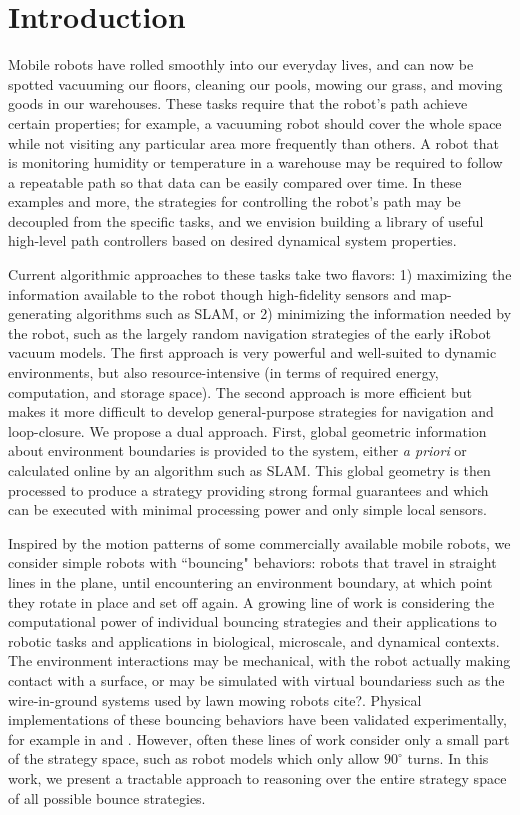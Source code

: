 \documentclass[]{styles/svproc}  %
\begin{document}
\section{Introduction}

Mobile robots have rolled smoothly into our everyday lives, and can now be
spotted vacuuming our floors, cleaning our pools, mowing our grass, and moving
goods in our warehouses. These tasks require that the robot's path achieve certain properties; for example, a 
vacuuming robot should cover the whole space while not visiting 
any particular area more frequently than others. A robot that is monitoring
humidity or temperature in a warehouse may be
required to follow a repeatable path so that data can be easily compared 
over time. In these examples and more, the strategies for controlling the robot's
path may be decoupled from the specific tasks, and we envision building a
library of useful high-level path controllers based on desired dynamical system
properties.

Current algorithmic approaches to these tasks take two flavors: 1)
maximizing the information available to the robot though high-fidelity sensors
and map-generating algorithms such as SLAM, or 2) minimizing the information needed
by the robot, such as the largely random navigation strategies of the early
iRobot vacuum models. The first approach is very powerful and well-suited to 
dynamic environments, but also
resource-intensive (in terms of required energy, computation, and storage
space).  The second approach 
is more efficient but makes it more difficult to develop general-purpose strategies 
for navigation and loop-closure. We propose a dual
approach. First, global geometric information about environment boundaries is provided 
to the system, either \emph{a priori} or calculated online by
an algorithm such as SLAM. This global geometry is then processed to produce
a strategy providing strong formal guarantees and which can be executed with minimal 
processing power and only simple local sensors.

Inspired by the motion patterns of some commercially available mobile robots, 
we consider simple robots with ``bouncing" behaviors: robots that
travel in straight lines in the plane, until encountering an environment
boundary, at which point they rotate in place and set off again. 
A growing line of work is considering the computational power of individual bouncing strategies
and their applications to robotic tasks and applications in biological, microscale, 
and dynamical contexts. The environment interactions may be mechanical,
with the robot actually making contact with a surface, or may be simulated with
virtual boundariess such as the wire-in-ground systems used by lawn mowing robots
{\color{red} cite?}. Physical implementations of these bouncing behaviors have
been validated experimentally, for example in \cite{LewOKa13} and
\cite{alam2018space}. However, often these lines of work consider only a small
part of the strategy space, such as robot models which only allow $90^{\circ}$
turns. In this work, we present a tractable approach to reasoning over the entire
strategy space of all possible bounce strategies.
\end{document}

